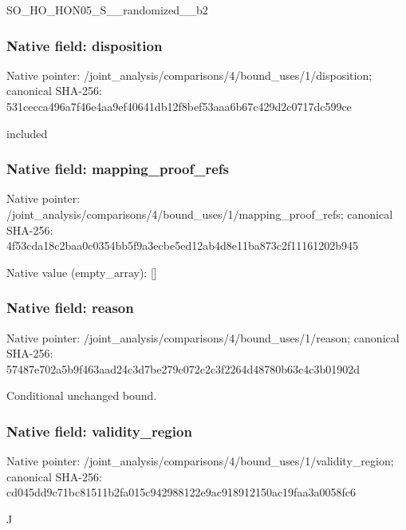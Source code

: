 \documentclass[10pt,a4paper]{article}
\begin{document}
\begingroup\raggedright\sloppy SO\_\allowbreak{}HO\_\allowbreak{}HON05\_\allowbreak{}S\_\allowbreak{}\_\allowbreak{}randomized\_\allowbreak{}\_\allowbreak{}b2\par\endgroup

\subsubsection{Native field: disposition}
Native pointer: /joint\_\allowbreak{}analysis/comparisons/4/bound\_\allowbreak{}uses/1/disposition; canonical SHA-256: 531cecca496a7f46e4aa9ef40641db12f8bef53aaa6b67c429d2c0717dc599ce

\begingroup\raggedright\sloppy included\par\endgroup

\subsubsection{Native field: mapping\_\allowbreak{}proof\_\allowbreak{}refs}
Native pointer: /joint\_\allowbreak{}analysis/comparisons/4/bound\_\allowbreak{}uses/1/mapping\_\allowbreak{}proof\_\allowbreak{}refs; canonical SHA-256: 4f53cda18c2baa0c0354bb5f9a3ecbe5ed12ab4d8e11ba873c2f11161202b945

Native value (empty\_\allowbreak{}array): []

\subsubsection{Native field: reason}
Native pointer: /joint\_\allowbreak{}analysis/comparisons/4/bound\_\allowbreak{}uses/1/reason; canonical SHA-256: 57487e702a5b9f463aad24c3d7be279c072c2c3f2264d48780b63c4c3b01902d

\begingroup\raggedright\sloppy Conditional unchanged bound.\par\endgroup

\subsubsection{Native field: validity\_\allowbreak{}region}
Native pointer: /joint\_\allowbreak{}analysis/comparisons/4/bound\_\allowbreak{}uses/1/validity\_\allowbreak{}region; canonical SHA-256: cd045dd9c71bc81511b2fa015c942988122e9ac918912150ac19faa3a0058fc6

\begingroup\raggedright\sloppy J\par\endgroup
\end{document}
